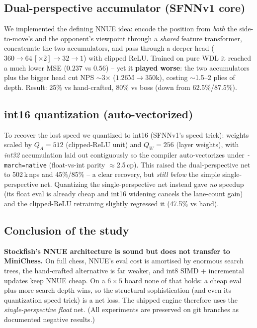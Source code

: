 \documentclass[11pt]{article}
\newcommand{\code}[1]{\texttt{#1}}
\begin{document}
\subsection{Dual-perspective accumulator (SFNNv1 core)}
We implemented the defining NNUE idea: encode the position from \emph{both} the
side-to-move's and the opponent's viewpoint through a \emph{shared} feature
transformer, concatenate the two accumulators, and pass through a deeper head
($360 \to 64\,[\times2] \to 32 \to 1$) with clipped ReLU. Trained on pure WDL it
reached a much lower MSE ($0.237$ vs $0.56$) -- yet it \textbf{played worse}: the
two accumulators plus the bigger head cut NPS $\sim$3$\times$
($1.26\text{M}\to350\text{k}$), costing $\sim$1.5--2 plies of depth. Result:
25\% vs hand-crafted, 80\% vs boss (down from 62.5\%/87.5\%).

\subsection{int16 quantization (auto-vectorized)}
To recover the lost speed we quantized to int16 (SFNNv1's speed trick): weights
scaled by $Q_A{=}512$ (clipped-ReLU unit) and $Q_W{=}256$ (layer weights), with
\emph{int32} accumulation laid out contiguously so the compiler auto-vectorizes
under \code{-march=native} (float-vs-int parity $\approx$2.5\,cp). This raised the
dual-perspective net to 502\,k\,nps and 45\%/85\% -- a clear recovery, but
\emph{still below} the simple single-perspective net. Quantizing the
single-perspective net instead gave \emph{no} speedup (its float eval is already
cheap and int16 widening cancels the lane-count gain) and the clipped-ReLU
retraining slightly regressed it (47.5\% vs hand).

\subsection{Conclusion of the study}
\textbf{Stockfish's NNUE architecture is sound but does not transfer to
MiniChess.} On full chess, NNUE's eval cost is amortised by enormous search
trees, the hand-crafted alternative is far weaker, and int8 SIMD + incremental
updates keep NNUE cheap. On a $6\times5$ board none of that holds: a cheap eval
plus more search depth wins, so the structural sophistication (and even its
quantization speed trick) is a net loss. The shipped engine therefore uses the
\emph{single-perspective float} net. (All experiments are preserved on git
branches as documented negative results.)

\end{document}

